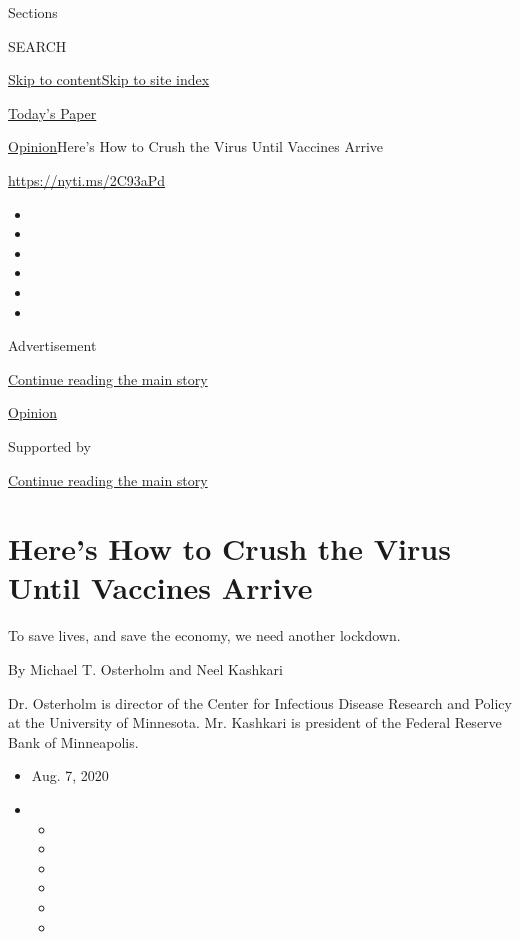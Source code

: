 Sections

SEARCH

\protect\hyperlink{site-content}{Skip to
content}\protect\hyperlink{site-index}{Skip to site index}

\href{https://myaccount.nytimes.com/auth/login?response_type=cookie\&client_id=vi}{}

\href{https://www.nytimes.com/section/todayspaper}{Today's Paper}

\href{/section/opinion}{Opinion}\textbar{}Here's How to Crush the Virus
Until Vaccines Arrive

\href{https://nyti.ms/2C93aPd}{https://nyti.ms/2C93aPd}

\begin{itemize}
\item
\item
\item
\item
\item
\item
\end{itemize}

Advertisement

\protect\hyperlink{after-top}{Continue reading the main story}

\href{/section/opinion}{Opinion}

Supported by

\protect\hyperlink{after-sponsor}{Continue reading the main story}

\hypertarget{heres-how-to-crush-the-virus-until-vaccines-arrive}{%
\section{Here's How to Crush the Virus Until Vaccines
Arrive}\label{heres-how-to-crush-the-virus-until-vaccines-arrive}}

To save lives, and save the economy, we need another lockdown.

By Michael T. Osterholm and Neel Kashkari

Dr. Osterholm is director of the Center for Infectious Disease Research
and Policy at the University of Minnesota. Mr. Kashkari is president of
the Federal Reserve Bank of Minneapolis.

\begin{itemize}
\item
  Aug. 7, 2020
\item
  \begin{itemize}
  \item
  \item
  \item
  \item
  \item
  \item
  \end{itemize}
\end{itemize}

